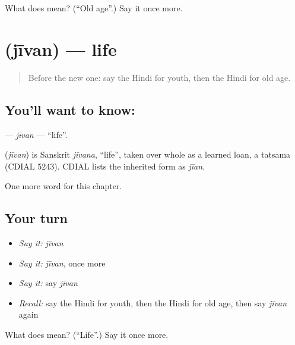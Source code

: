 \begin{tcolorbox}[breakable,colback=teal!4,colframe=teal!35!black,title={Before you move on}]
What does  mean? (\textquotedblleft{}Old age\textquotedblright{}.) Say it once more.
\end{tcolorbox}
\section[\texorpdfstring{\hi{जीवन} (jīvan)}{जीवन (jīvan)}]{ (jīvan) — life}

\label{lesson:HI-C220-jivan}



\begin{quote}
Before the new one: say the Hindi for youth, then the Hindi for old age.
\end{quote}

\subsection*{You'll want to know: }
\textbf{} — \emph{jīvan} — \textquotedblleft{}life\textquotedblright{}.

\begin{cousinweb}
\textbf{} (\emph{jīvan}) is Sanskrit \emph{jīvana}, \textquotedblleft{}life\textquotedblright{}, taken over whole as a learned loan, a tatsama (CDIAL 5243). CDIAL lists the inherited form as \emph{jīan}.
\end{cousinweb}

\begin{grammarlens}[title={What you've built}]
One more word for this chapter.
\end{grammarlens}

\subsection*{Your turn}
\begin{itemize}
\raggedright
  \item \emph{Say it:} \emph{jīvan}
  \item \emph{Say it:} \emph{jīvan}, once more
  \item \emph{Say it:} say \emph{jīvan}
  \item \emph{Recall:} say the Hindi for youth, then the Hindi for old age, then say \emph{jīvan} again
\end{itemize}

\begin{tcolorbox}[breakable,colback=teal!4,colframe=teal!35!black,title={Before you move on}]
What does  mean? (\textquotedblleft{}Life\textquotedblright{}.) Say it once more.
\end{tcolorbox}
